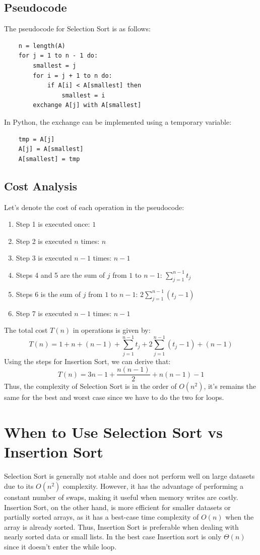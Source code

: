     \subsection{Pseudocode}
    The pseudocode for Selection Sort is as follows:
    
    \begin{verbatim}
    n = length(A)
    for j = 1 to n - 1 do:
        smallest = j
        for i = j + 1 to n do:
            if A[i] < A[smallest] then
                smallest = i
        exchange A[j] with A[smallest]
    \end{verbatim}
    In Python, the exchange can be implemented using a temporary variable:
    \begin{verbatim}
    tmp = A[j]
    A[j] = A[smallest]
    A[smallest] = tmp
    \end{verbatim}
    
    \subsection{Cost Analysis}
    Let's denote the cost of each operation in the pseudocode:
    
    \begin{enumerate}
        \item Step 1 is executed once: \( 1 \)
        \item Step 2 is executed \( n \) times: \( n \)
        \item Step 3 is executed \( n-1 \) times: \( n - 1 \)
        \item Steps 4 and 5 are the sum of \( j \) from \( 1 \) to \( n-1 \): \( \sum_{j=1}^{n-1} t_j \)
        \item Steps 6 is the sum of \( j \) from \( 1 \) to \( n-1 \): \( 2 \sum_{j=1}^{n-1} (t_j - 1) \)
        \item Step 7 is executed \( n - 1 \) times: \( n - 1 \)
    \end{enumerate}
    The total cost \( T(n) \) in operations is given by:
    \[
    T(n) = 1 + n + (n - 1) + \sum_{j=1}^{n-1} t_j + 2 \sum_{j=1}^{n-1} (t_j - 1) + (n - 1)
    \]
    Using the steps for Insertion Sort, we can derive that:
    \[
    T(n) = 3n - 1 + \frac{n(n-1)}{2} + n(n-1) - 1
    \]
    Thus, the complexity of Selection Sort is in the order of \( O(n^2) \), it's remains the same for the best and worst case since we have to do the two for loops.
    
    \section{When to Use Selection Sort vs Insertion Sort}
    Selection Sort is generally not stable and does not perform well on large datasets due to its \( O(n^2) \) complexity. However, it has the advantage of performing a constant number of swaps, making it useful when memory writes are costly. \newline
    Insertion Sort, on the other hand, is more efficient for smaller datasets or partially sorted arrays, as it has a best-case time complexity of \( O(n) \) when the array is already sorted. Thus, Insertion Sort is preferable when dealing with nearly sorted data or small lists. In the best case Insertion sort is only $\Theta(n)$ since it doesn't enter the while loop.
